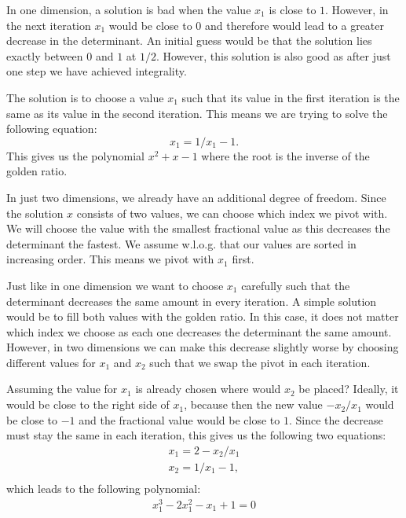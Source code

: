 \documentclass[english,version-2020-11]{uzl-thesis}
\begin{document}
In one dimension, a solution is bad when the value $x_1$ is close to $1$.
However, in the next iteration $x_1$ would be close to $0$ and therefore
would lead to a greater decrease in the determinant.
An initial guess would be that the solution lies exactly between $0$ and $1$ at $1/2$.
However, this solution is also good as after just one step we have achieved integrality.

The solution is to choose a value $x_1$ such that its value in the first
iteration is the same as its value in the second iteration.
This means we are trying to solve the following equation:
\[
  x_1 = 1/x_1 - 1.
\]
This gives us the polynomial $x^2 + x - 1$ where the root is the inverse of the
golden ratio.

In just two dimensions, we already have an additional degree of freedom.
Since the solution $x$ consists of two values, we can choose which index we pivot with.
We will choose the value with the smallest fractional value as this decreases
the determinant the fastest.
We assume w.l.o.g. that our values are sorted in increasing order.
This means we pivot with $x_1$ first.

Just like in one dimension we want to choose $x_1$ carefully such that the
determinant decreases the same amount in every iteration.
A simple solution would be to fill both values with the golden ratio.
In this case, it does not matter which index we choose as each one decreases
the determinant the same amount.
However, in two dimensions we can make this decrease slightly worse
by choosing different values for $x_1$ and $x_2$ such that we swap the pivot
in each iteration.

Assuming the value for $x_1$ is already chosen where would $x_2$ be placed?
Ideally, it would be close to the right side of $x_1$, because then the new
value $-x_2 / x_1$ would be close to $-1$ and the fractional value would be
close to $1$.
Since the decrease must stay the same in each iteration, this gives us the
following two equations:
\begin{align*}
  x_1 = 2 - x_2 / x_1 \\
  x_2 = 1 / x_1 - 1,\\
\end{align*}
which leads to the following polynomial:
\begin{align*}
  x_1^3 - 2x_1^2 - x_1 + 1 = 0
\end{align*}
\end{document}
